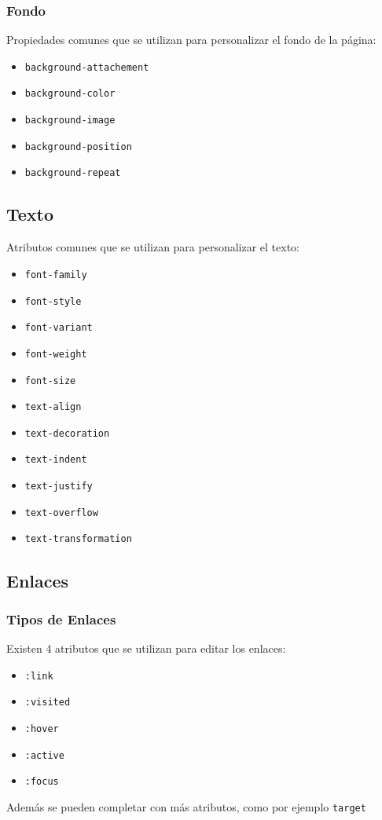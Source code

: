 \documentclass{beamer}
\begin{document}
\begin{frame}[fragile] %
\frametitle{Fondo}
	Propiedades comunes que se utilizan para personalizar el fondo de la página:
	\begin{itemize}
	\item \verb|background-attachement|
	\item \verb|background-color|	
	\item \verb|background-image|
	\item \verb|background-position|
	\item \verb|background-repeat|
	\end{itemize}
\end{frame}

	\subsection{Texto}
\begin{frame}[fragile]
	Atributos comunes que se utilizan para personalizar el texto:
	\begin{multicols}{2}
	\begin{itemize}
	\item \verb|font-family|
	\item \verb|font-style|
	\item \verb|font-variant|
	\item \verb|font-weight|
	\item \verb|font-size|
	\item \verb|text-align|
	\item \verb|text-decoration|
	\item \verb|text-indent|
	\item \verb|text-justify|
	\item \verb|text-overflow|
	\item \verb|text-transformation|
	\end{itemize}
	\end{multicols}
\end{frame}

	\subsection{Enlaces}
\begin{frame}[fragile] %
\frametitle{Tipos de Enlaces}
	Existen 4 atributos que se utilizan para editar los enlaces:
	\begin{itemize}[<+->]
	\item \verb|:link|
	\item \verb|:visited|
	\item \verb|:hover|
	\item \verb|:active|
	\item \verb|:focus|
	\end{itemize}
	 Además se pueden completar con más atributos, como por ejemplo \verb|target|
\end{frame}
\end{document}
